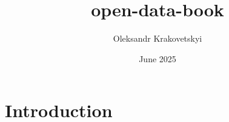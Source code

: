 \documentclass{article}
\title{open-data-book}
\author{Oleksandr Krakovetskyi}
\date{June 2025}
\begin{document}
\maketitle

\section{Introduction}
\end{document}
